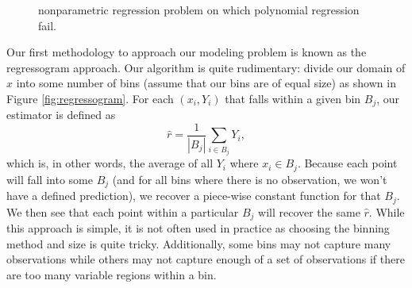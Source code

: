 \begin{figure}[htbp!]
	\begin{center}
		\caption{nonparametric regression problem on which polynomial regression fail.}
		\label{fig:nonparametric regression example}
	\end{center}
\end{figure}


Our first methodology to approach our modeling problem is known as the regressogram approach. Our algorithm is quite rudimentary: divide our domain of $x$ into some number of bins (assume that our bins are of equal size) as shown in Figure \ref{fig:regressogram}. For each $(x_i, Y_i)$ that falls within a given bin $B_j$, our estimator is defined as
 \begin{equation}\hat{r} = \frac{1}{|B_j|}\sum_{i \in B_j} Y_i,\end{equation}
 which is, in other words, the average of all $Y_i$ where $x_i \in B_j$. Because each point will fall into some $B_j$ (and for all bins where there is no observation, we won't have a defined prediction), we recover a piece-wise constant function for that $B_j$. We then see that each point within a particular $B_j$ will recover the same $\hat{r}$. While this approach is simple, it is not often used in practice as choosing the binning method and size is quite tricky. Additionally, some bins may not capture many observations while others may not capture enough of a set of observations if there are too many variable regions within a bin. 

